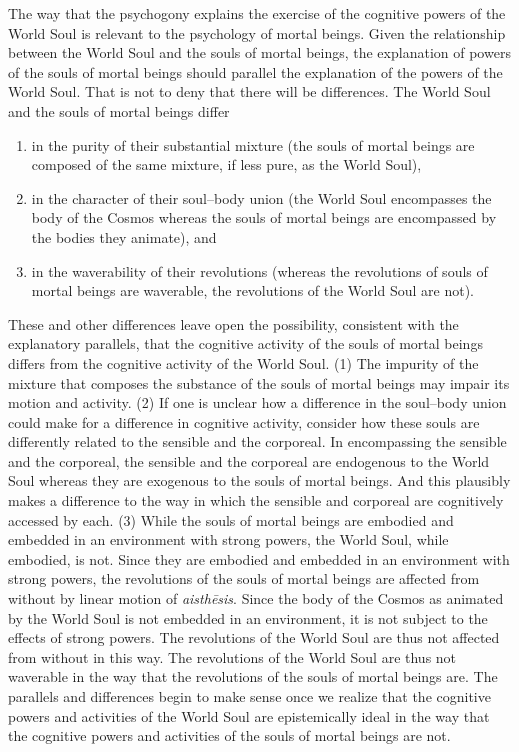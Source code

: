 The way that the psychogony explains the exercise of the cognitive powers of the World Soul is relevant to the psychology of mortal beings. Given the relationship between the World Soul and the souls of mortal beings, the explanation of powers of the souls of mortal beings should parallel the explanation of the powers of the World Soul. That is not to deny that there will be differences. The World Soul and the souls of mortal beings differ 
\begin{enumerate}[(1)]
	\item in the purity of their substantial mixture (the souls of mortal beings are composed of the same mixture, if less pure, as the World Soul),
	\item in the character of their soul--body union (the World Soul encompasses the body of the Cosmos whereas the souls of mortal beings are encompassed by the bodies they animate), and
	\item in the waverability of their revolutions (whereas the revolutions of souls of mortal beings are waverable, the revolutions of the World Soul are not).
\end{enumerate}
These and other differences leave open the possibility, consistent with the explanatory parallels, that the cognitive activity of the souls of mortal beings differs from the cognitive activity of the World Soul. (1) The impurity of the mixture that composes the substance of the souls of mortal beings may impair its motion and activity. (2) If one is unclear how a difference in the soul--body union could make for a difference in cognitive activity, consider how these souls are differently related to the sensible and the corporeal. In encompassing the sensible and the corporeal, the sensible and the corporeal are endogenous to the World Soul whereas they are exogenous to the souls of mortal beings. And this plausibly makes a difference to the way in which the sensible and corporeal are cognitively accessed by each. (3) While the souls of mortal beings are embodied and embedded in an environment with strong powers, the World Soul, while embodied, is not. Since they are embodied and embedded in an environment with strong powers, the revolutions of the souls of mortal beings are affected from without by linear motion of \emph{aisthēsis}. Since the body of the Cosmos as animated by the World Soul is not embedded in an environment, it is not subject to the effects of strong powers. The revolutions of the World Soul are thus not affected from without in this way. The revolutions of the World Soul are thus not waverable in the way that the revolutions of the souls of mortal beings are. The parallels and differences begin to make sense once we realize that the cognitive powers and activities of the World Soul are epistemically ideal in the way that the cognitive powers and activities of the souls of mortal beings are not.

